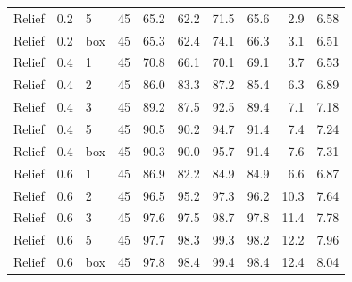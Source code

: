 \begin{table}[htbp]
\begin{tabular}{@{}lllrrrrrrr@{}}
Relief & 0.2 & 5 & 45 & 65.2 & 62.2 & 71.5 & 65.6 & 2.9 & 6.58\\
Relief & 0.2 & box & 45 & 65.3 & 62.4 & 74.1 & 66.3 & 3.1 & 6.51\\
Relief & 0.4 & 1 & 45 & 70.8 & 66.1 & 70.1 & 69.1 & 3.7 & 6.53\\
Relief & 0.4 & 2 & 45 & 86.0 & 83.3 & 87.2 & 85.4 & 6.3 & 6.89\\
Relief & 0.4 & 3 & 45 & 89.2 & 87.5 & 92.5 & 89.4 & 7.1 & 7.18\\
Relief & 0.4 & 5 & 45 & 90.5 & 90.2 & 94.7 & 91.4 & 7.4 & 7.24\\
Relief & 0.4 & box & 45 & 90.3 & 90.0 & 95.7 & 91.4 & 7.6 & 7.31\\
Relief & 0.6 & 1 & 45 & 86.9 & 82.2 & 84.9 & 84.9 & 6.6 & 6.87\\
Relief & 0.6 & 2 & 45 & 96.5 & 95.2 & 97.3 & 96.2 & 10.3 & 7.64\\
Relief & 0.6 & 3 & 45 & 97.6 & 97.5 & 98.7 & 97.8 & 11.4 & 7.78\\
Relief & 0.6 & 5 & 45 & 97.7 & 98.3 & 99.3 & 98.2 & 12.2 & 7.96\\
Relief & 0.6 & box & 45 & 97.8 & 98.4 & 99.4 & 98.4 & 12.4 & 8.04\\
\bottomrule
\end{tabular}
\end{table}
